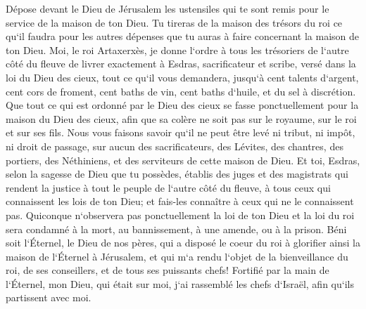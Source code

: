 \verse Dépose devant le Dieu de Jérusalem les ustensiles qui te sont remis pour le service de la maison de ton Dieu. 
\verse Tu tireras de la maison des trésors du roi ce qu`il faudra pour les autres dépenses que tu auras à faire concernant la maison de ton Dieu. 
\verse Moi, le roi Artaxerxès, je donne l`ordre à tous les trésoriers de l`autre côté du fleuve de livrer exactement à Esdras, sacrificateur et scribe, versé dans la loi du Dieu des cieux, tout ce qu`il vous demandera, 
\verse jusqu`à cent talents d`argent, cent cors de froment, cent baths de vin, cent baths d`huile, et du sel à discrétion. 
\verse Que tout ce qui est ordonné par le Dieu des cieux se fasse ponctuellement pour la maison du Dieu des cieux, afin que sa colère ne soit pas sur le royaume, sur le roi et sur ses fils. 
\verse Nous vous faisons savoir qu`il ne peut être levé ni tribut, ni impôt, ni droit de passage, sur aucun des sacrificateurs, des Lévites, des chantres, des portiers, des Néthiniens, et des serviteurs de cette maison de Dieu. 
\verse Et toi, Esdras, selon la sagesse de Dieu que tu possèdes, établis des juges et des magistrats qui rendent la justice à tout le peuple de l`autre côté du fleuve, à tous ceux qui connaissent les lois de ton Dieu; et fais-les connaître à ceux qui ne le connaissent pas. 
\verse Quiconque n`observera pas ponctuellement la loi de ton Dieu et la loi du roi sera condamné à la mort, au bannissement, à une amende, ou à la prison. 
\verse Béni soit l`Éternel, le Dieu de nos pères, qui a disposé le coeur du roi à glorifier ainsi la maison de l`Éternel à Jérusalem, 
\verse et qui m`a rendu l`objet de la bienveillance du roi, de ses conseillers, et de tous ses puissants chefs! Fortifié par la main de l`Éternel, mon Dieu, qui était sur moi, j`ai rassemblé les chefs d`Israël, afin qu`ils partissent avec moi. 

\chapter{}


